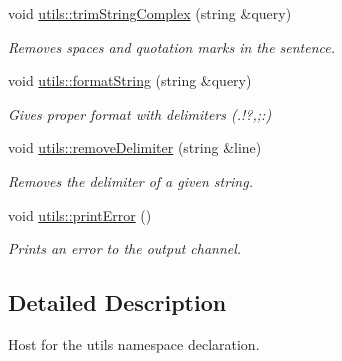 \begin{DoxyCompactItemize}
void \hyperlink{namespaceutils_a0362c7510f0bb0c4449031f897626696}{utils\+::trim\+String\+Complex} (string \&query)
\begin{DoxyCompactList}\small\item\em Removes spaces and quotation marks in the sentence. \end{DoxyCompactList}\item 
void \hyperlink{namespaceutils_a8b0beed284a3321a1f9a08e23bdb3611}{utils\+::format\+String} (string \&query)
\begin{DoxyCompactList}\small\item\em Gives proper format with delimiters (.!?,;\+:) \end{DoxyCompactList}\item 
void \hyperlink{namespaceutils_adf961974462ef6e8d7ccc32311397d75}{utils\+::remove\+Delimiter} (string \&line)
\begin{DoxyCompactList}\small\item\em Removes the delimiter of a given string. \end{DoxyCompactList}\item 
void \hyperlink{namespaceutils_afd76dd21b41c50ce7396e30fb5d8d75b}{utils\+::print\+Error} ()
\begin{DoxyCompactList}\small\item\em Prints an error to the output channel. \end{DoxyCompactList}\end{DoxyCompactItemize}


\subsection{Detailed Description}
Host for the utils namespace declaration. 

